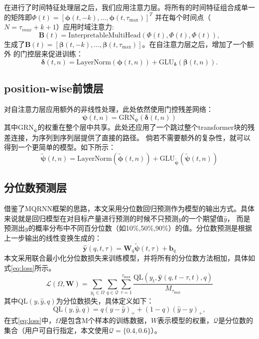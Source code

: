 在进行了时间特征处理层之后，我们应用注意力层。将所有的时间特征组合成单一的矩阵即$\bm{\varPhi }(t) = \left[ \bm{\phi} (t, -k), \ldots, \bm{\phi }(t, \tau_{\text{max}}) \right]^T$
并在每个时间点（$N = \tau _{max} + k + 1$）应用时域注意力:
\begin{equation}
    \mathbf{B}(t) = \text{InterpretableMultiHead}(\mathbf{\varPhi }(t), \mathbf{\varPhi }(t), \mathbf{\varPhi }(t)),
\end{equation}
生成了$\mathbf{B}(t) = \left[ \mathbf{\beta }(t, -k), \ldots, \mathbf{\beta }(t, \tau_{\max}) \right]$。在自注意力层之后，增加了一个额外
的门控层来促进训练：
\begin{equation}
    \boldsymbol{\delta}(t, n) = \text{LayerNorm}(\boldsymbol{\phi }(t, n)) + \text{GLU}_{\boldsymbol{\delta}}(\boldsymbol{\beta}(t, n)).
\end{equation}
\subsection{position-wise前馈层}
对自注意力层应用额外的非线性处理，此处依然使用门控残差网络：
\begin{equation}
    \boldsymbol{\psi}(t, n) = \text{GRN}_{\boldsymbol{\psi}}(\boldsymbol{\delta}(t, n))
\end{equation}
其中$ \text{GRN}_{\boldsymbol{\psi}}$的权重在整个层中共享。此处还应用了一个跳过整个transformer块的残差连接，为序列到序列层提供了直接的路径。
倘若不需要额外的复杂性，就可以得到一个更简单的模型。如下所示：
\begin{equation}
    \tilde{\boldsymbol{\psi}}(t, n) = \text{LayerNorm}(\tilde{\boldsymbol{\phi}}(t, n)) + \text{GLU}_{\tilde{\boldsymbol{\psi}}}(\tilde{\boldsymbol{\psi}}(t, n))
\end{equation}
\subsection{分位数预测层}
借鉴了MQRNN框架的思路，本文采用分位数回归预测作为模型的输出方式。具体来说就是回归模型在对目标产量进行预测的时候不只预测$y$的一个期望值$\hat{y}$，
而是预测出$y$的概率分布中不同百分位数（如10\%,50\%,90\%）的值。分位数预测是根据上一步输出的线性变换生成的：
\begin{equation}
    \hat{\boldsymbol{y}}(q, t, \tau) = \mathbf{W}_q \tilde{\boldsymbol{\psi}}(t, \tau) + \mathbf{b}_q
\end{equation}
本文采用联合最小化分位数损失来训练模型，并将所有的分位数方法相加，具体如式\eqref{eq:loss}所示。
\begin{equation}
    \mathcal{L}(\Omega, \mathbf{W}) = \sum_{y_t \in \Omega} \sum_{q \in \mathcal{Q} } \sum_{\tau=1}^{\tau_{\max}} \frac{\text{QL}(y_t, \hat{\boldsymbol{y}}(q, t - \tau, t), q)}{M_{\tau_{\max}}}
    \label{eq:loss}
\end{equation}
其中$\text{QL}(y,\hat{y},q)$为分位数损失，具体定义如下：
\begin{equation}
    \text{QL}(y, \hat{y}, q) = q(y - \hat{y})_+ + (1 - q)(\hat{y} - y)_+,
\end{equation}
在式\eqref{eq:loss}中，$\Omega$是包含M个样本的训练数据，$W$表示模型的权重，$\mathcal{Q}$是分位数的集合（用户可自行指定，本文使用$\mathcal{Q} = \{0.4, 0.6\}$）。
